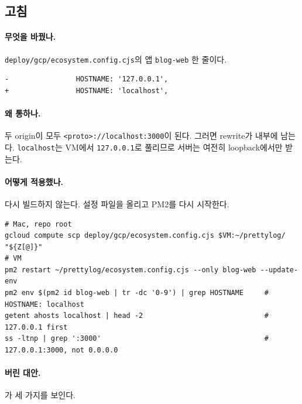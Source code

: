 \subsection{고침}\label{sec:dbg-sp-fix}

\paragraph{무엇을 바꿨나.}
\texttt{deploy/gcp/ecosystem.config.cjs}의 앱 \texttt{blog-web} 한 줄이다.

\begin{lstlisting}[language={}]
-                HOSTNAME: '127.0.0.1',
+                HOSTNAME: 'localhost',
\end{lstlisting}

\paragraph{왜 통하나.}
두 origin이 모두 \texttt{<proto>://localhost:3000}이 된다.
그러면 rewrite가 내부에 남는다.
\texttt{localhost}는 VM에서 \texttt{127.0.0.1}로 풀리므로 서버는 여전히 loopback에서만 받는다.

\paragraph{어떻게 적용했나.}
다시 빌드하지 않는다. 설정 파일을 올리고 PM2를 다시 시작한다.

\begin{lstlisting}[language={}]
# Mac, repo root
gcloud compute scp deploy/gcp/ecosystem.config.cjs $VM:~/prettylog/ "${Z[@]}"
# VM
pm2 restart ~/prettylog/ecosystem.config.cjs --only blog-web --update-env
pm2 env $(pm2 id blog-web | tr -dc '0-9') | grep HOSTNAME     # HOSTNAME: localhost
getent ahosts localhost | head -2                             # 127.0.0.1 first
ss -ltnp | grep ':3000'                                       # 127.0.0.1:3000, not 0.0.0.0
\end{lstlisting}

\paragraph{버린 대안.}
가 세 가지를 보인다.

